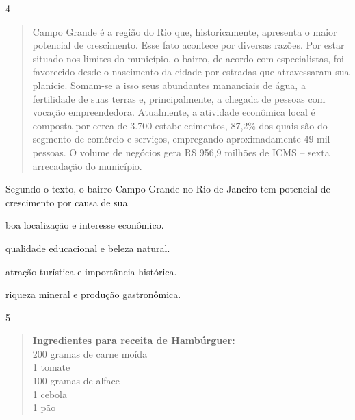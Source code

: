 \num{4}

\begin{quote}
Campo Grande é a região do Rio que, historicamente, apresenta o maior
potencial de crescimento. Esse fato acontece por diversas razões. Por
estar situado nos limites do município, o bairro, de acordo com
especialistas, foi favorecido desde o nascimento da cidade por estradas
que atravessaram sua planície. Somam-se a isso seus abundantes
mananciais de água, a fertilidade de suas terras e, principalmente, a
chegada de pessoas com vocação empreendedora. Atualmente, a atividade
econômica local é composta por cerca de 3.700 estabelecimentos, 87,2\%
dos quais são do segmento de comércio e serviços, empregando
aproximadamente 49 mil pessoas. O volume de negócios gera R\$ 956,9
milhões de ICMS -- sexta arrecadação do município.
\end{quote}

Segundo o texto, o bairro Campo Grande no Rio de Janeiro tem potencial
de crescimento por causa de sua

\begin{escolha}
\item boa localização e interesse econômico.

\item qualidade educacional e beleza natural.

\item atração turística e importância histórica.

\item riqueza mineral e produção gastronômica.
\end{escolha}


\num{5}

\begin{quote}
\textbf{Ingredientes para receita de Hambúrguer:}\\
200 gramas de carne moída\\
1 tomate\\
100 gramas de alface\\
1 cebola\\
1 pão
\end{quote}

